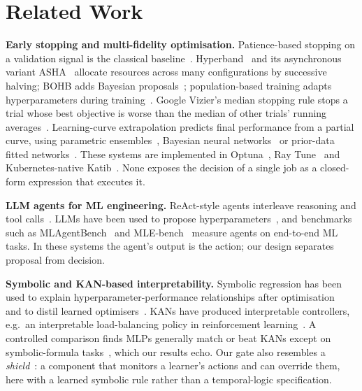 \documentclass[conference]{IEEEtran}
\begin{document}
\section{Related Work}
\textbf{Early stopping and multi-fidelity optimisation.} Patience-based stopping on a validation signal is the classical baseline~\cite{prechelt2012early}. Hyperband~\cite{li2018hyperband} and its asynchronous variant ASHA~\cite{li2020asha} allocate resources across many configurations by successive halving; BOHB adds Bayesian proposals~\cite{falkner2018bohb}; population-based training adapts hyperparameters during training~\cite{jaderberg2017pbt}. Google Vizier's median stopping rule stops a trial whose best objective is worse than the median of other trials' running averages~\cite{golovin2017vizier}. Learning-curve extrapolation predicts final performance from a partial curve, using parametric ensembles~\cite{domhan2015extrapolation}, Bayesian neural networks~\cite{klein2017lcnet} or prior-data fitted networks~\cite{adriaensen2023lcpfn}. These systems are implemented in Optuna~\cite{akiba2019optuna}, Ray Tune~\cite{liaw2018tune} and Kubernetes-native Katib~\cite{george2020katib}. None exposes the decision of a single job as a closed-form expression that executes it.

\textbf{LLM agents for ML engineering.} ReAct-style agents interleave reasoning and tool calls~\cite{yao2023react}. LLMs have been used to propose hyperparameters~\cite{zhang2023llmhpo,liu2024agenthpo}, and benchmarks such as MLAgentBench~\cite{huang2024mlagentbench} and MLE-bench~\cite{chan2025mlebench} measure agents on end-to-end ML tasks. In these systems the agent's output is the action; our design separates proposal from decision.

\textbf{Symbolic and KAN-based interpretability.} Symbolic regression has been used to explain hyperparameter-performance relationships after optimisation~\cite{segel2023symbolic} and to distil learned optimisers~\cite{zheng2022symbolicl2o}. KANs have produced interpretable controllers, e.g.\ an interpretable load-balancing policy in reinforcement learning~\cite{singh2025kanrl}. A controlled comparison finds MLPs generally match or beat KANs except on symbolic-formula tasks~\cite{yu2024kanormlp}, which our results echo. Our gate also resembles a \emph{shield}~\cite{alshiekh2018shielding}: a component that monitors a learner's actions and can override them, here with a learned symbolic rule rather than a temporal-logic specification.
\end{document}
